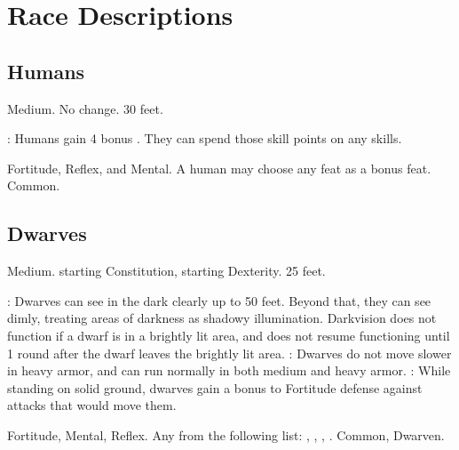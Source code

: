 \section{Race Descriptions}

\subsection{Humans}
 Medium.
 No change.
 30 feet.
\begin{itemize}
    : Humans gain 4 bonus . They can spend those skill points on any skills.
\end{itemize}
  Fortitude, Reflex, and Mental.
 A human may choose any feat as a bonus feat.
 Common.

\subsection{Dwarves}
 Medium.
  starting Constitution,  starting Dexterity.
 25 feet.
\begin{itemize}
    : Dwarves can see in the dark clearly up to 50 feet.   Beyond that, they can see dimly, treating areas of darkness as shadowy illumination. Darkvision does not function if a dwarf is in a brightly lit area, and does not resume functioning until 1 round after the dwarf leaves the brightly lit area.
    : Dwarves do not move slower in heavy armor, and can run normally in both medium and heavy armor.
    : While standing on solid ground, dwarves gain a  bonus to Fortitude defense against attacks that would move them.
\end{itemize}
  Fortitude,  Mental,  Reflex.
 Any from the following list: , , , .
 Common, Dwarven.

